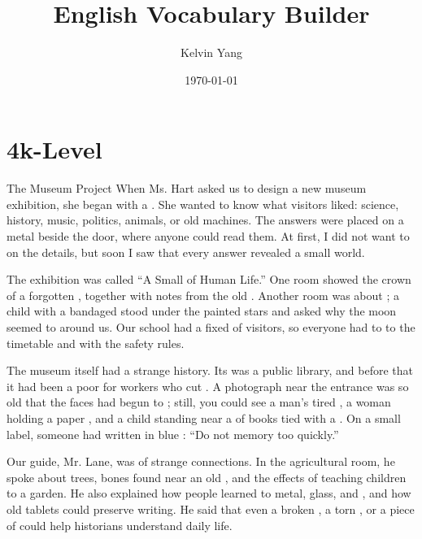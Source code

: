 \documentclass[12pt]{nextbook}
\title{English Vocabulary Builder}
\author{Kelvin Yang}
\date{\today}
\begin{document}
\frontmatter
\maketitle
\tableofcontents
\mainmatter
\chapter{4k-Level}
\begin{readersection}{The Museum Project}
When Ms. Hart asked us to design a new museum exhibition, she began with a . She wanted to know what visitors liked: science, history, music, politics, animals, or old machines. The answers were placed on a metal  beside the door, where anyone could read them. At first, I did not want to  on the details, but soon I saw that every answer revealed a small world.

The exhibition was called “A Small  of Human Life.” One room showed the crown of a forgotten , together with notes from the old . Another room was about ; a child with a bandaged  stood under the painted stars and asked why the moon seemed to  around us. Our school had a fixed  of visitors, so everyone had to  to the timetable and  with the safety rules.

The museum itself had a strange history. Its  was a public library, and before that it had been a poor  for workers who cut . A photograph near the entrance was so old that the faces had begun to ; still, you could see a man’s tired , a woman holding a paper , and a child standing near a  of books tied with a . On a small label, someone had written in blue : “Do not  memory too quickly.”

Our guide, Mr. Lane, was  of strange connections. In the agricultural room, he spoke about  trees,  bones found near an old , and the  effects of teaching children to  a garden. He also explained how people learned to  metal, glass, and , and how old  tablets could preserve writing. He said that even a broken , a torn , or a piece of  could help historians understand daily life.


\end{readersection}
\end{document}
